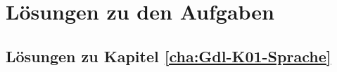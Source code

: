 \newcommand{\AUTOR}{Andreas Zeh-Marschke}
\newcommand{\AUTORKURZ}{A. Zeh-Marschke}
\newcommand{\TITEL}{Mathematische Grundlagen}
\newcommand{\UNTERTITEL}{Grundbegriffe}
\newcommand{\DATUM}{23.04.2025}
\newcommand{\VERSION}{0.8-025}
\newcommand{\IDENT}{MathGdl.tex}
\newcommand{\BIBLIOTHEK}{BibMathGdl.bib}
\newcommand{\COPYRIGHT}{2025}

\newcommand{\INDEXNAMEN}{JA}
\newcommand{\INDEXABKUERZUNGEN}{JA}




\hyphenation{ }

\deckblattBuch


\tableofcontents

\listoffigures
\listoftables

\newcommand{\mitAufgaben}{Ja}
\newcommand{\mitLoesungen}{Nein}








\appendix
%
\renewcommand{\mitAufgaben}{Nein}
\renewcommand{\mitLoesungen}{Ja}

\setcounter{chapter}{11}
\chapter{Lösungen zu den Aufgaben}
\section{Lösungen zu Kapitel \ref{cha:Gdl-K01-Sprache}}

%
%
%
%
%

\printbibliography  %
\PRINTINDEXES



